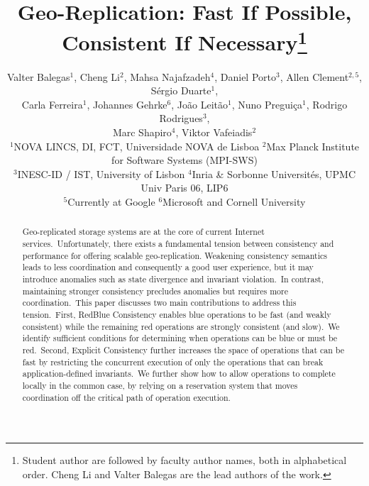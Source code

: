 \documentclass[11pt]{article}
\begin{document}
\title{Geo-Replication: Fast If Possible, Consistent If Necessary\thanks{Student author are followed by faculty author names, both in alphabetical order. Cheng Li and Valter Balegas are the lead authors of the work.}}

\author{Valter Balegas$^1$, Cheng Li$^2$, Mahsa Najafzadeh$^4$, Daniel Porto$^{3}$, 
Allen Clement$^{2,5}$, Sérgio Duarte$^1$, \\
Carla Ferreira$^1$, Johannes Gehrke$^6$, Jo\~{a}o Leit\~{a}o$^1$, Nuno Preguiça$^1$, Rodrigo Rodrigues$^3$, \\
Marc Shapiro$^4$, Viktor Vafeiadis$^2$\\
\small $^1$NOVA LINCS, DI, FCT, Universidade NOVA de Lisboa
$^2$Max Planck Institute for Software Systems (MPI-SWS)\\
\small $^3$INESC-ID / IST, University of Lisbon 
$^4$Inria \& Sorbonne Universités, UPMC Univ Paris 06, LIP6\\
\small $^5$Currently at Google
$^6$Microsoft and Cornell University}


\maketitle

\begin{abstract}
Geo-replicated storage systems are at the core of current Internet services.\ Unfortunately,
there exists a fundamental tension between consistency and performance for offering scalable
geo-replication. Weakening consistency semantics leads to less coordination and consequently
a good user experience, but it may introduce anomalies such as state divergence and invariant violation.\ In
contrast, maintaining stronger consistency precludes anomalies but requires more coordination.\ This
paper discusses two main contributions to address this tension.\ First, RedBlue Consistency
enables blue operations to be fast (and weakly consistent) while the remaining red operations
are strongly consistent (and slow).\ We identify sufficient conditions for determining when
operations can be blue or must be red.\ Second, Explicit Consistency further increases the space
of operations that can be fast by restricting the concurrent execution of only the operations
that can break application-defined invariants.\ We further show how to allow operations to complete
locally in the common case, by relying on a reservation system that moves coordination off the
critical path of operation execution.
\end{abstract}
\end{document}
